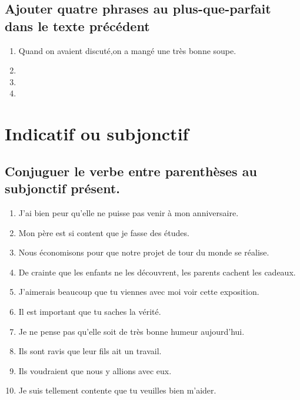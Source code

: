 \documentclass[12pt]{article}
\newcommand{\bleu}[1]{{\color{blue}#1}}
\begin{document}
\subsection{Ajouter quatre phrases au plus-que-parfait dans le texte précédent}
\begin{enumerate}
	\item Quand on avaient discuté,on a mangé une très bonne soupe.
	\item 
	\item
	\item
\end{enumerate}


\section{Indicatif ou subjonctif}
\subsection{Conjuguer le verbe entre parenthèses au subjonctif présent.}
\begin{enumerate}
	\item J’ai bien peur qu’elle ne \bleu{puisse} pas venir à mon anniversaire.
	\item Mon père est si content que je \bleu{fasse} des études.
	\item Nous économisons pour que notre projet de tour du monde \bleu{se réalise}.
	\item De crainte que les enfants ne les \bleu{découvrent}, les parents cachent les cadeaux.
	\item J’aimerais beaucoup que tu \bleu{viennes} avec moi voir cette exposition.
	\item Il est important que tu \bleu{saches} la vérité.
	\item Je ne pense pas qu’elle \bleu{soit} de très bonne humeur aujourd'hui.
	\item Ils sont ravis que leur fils \bleu{ait} un travail.
	\item Ils voudraient que nous y \bleu{allions} avec eux.
	\item Je suis tellement contente que tu \bleu{veuilles} bien m’aider.
\end{enumerate}
\end{document}
